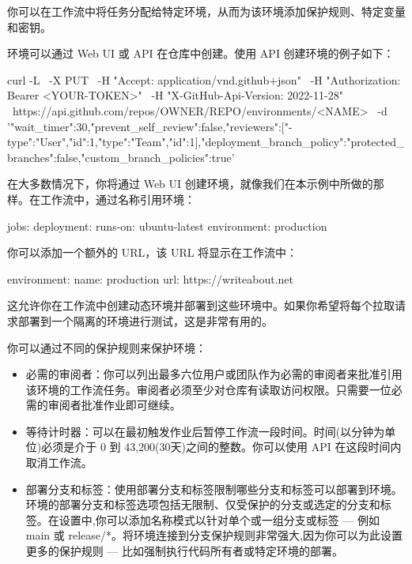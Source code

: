
你可以在工作流中将任务分配给特定环境，从而为该环境添加保护规则、特定变量和密钥。


环境可以通过 Web UI 或 API 在仓库中创建。使用 API 创建环境的例子如下：

\begin{shell}
curl -L \
  -X PUT \
  -H "Accept: application/vnd.github+json" \
  -H "Authorization: Bearer <YOUR-TOKEN>" \
  -H "X-GitHub-Api-Version: 2022-11-28" \
  https://api.github.com/repos/OWNER/REPO/environments/<NAME> \
  -d '{"wait_timer":30,"prevent_self_review":false,"reviewers":[{"-type":"User","id":1},{"type":"Team","id":1}],"deployment_branch_policy":{"protected_branches":false,"custom_branch_policies":true}}'
\end{shell}

在大多数情况下，你将通过 Web UI 创建环境，就像我们在本示例中所做的那样。在工作流中，通过名称引用环境：

\begin{shell}
jobs:
  deployment:
    runs-on: ubuntu-latest
    environment: production
\end{shell}

你可以添加一个额外的 URL，该 URL 将显示在工作流中：

\begin{shell}
environment:
  name: production
  url: https://writeabout.net
\end{shell}

这允许你在工作流中创建动态环境并部署到这些环境中。如果你希望将每个拉取请求部署到一个隔离的环境进行测试，这是非常有用的。

你可以通过不同的保护规则来保护环境：

\begin{itemize}
\item 
必需的审阅者：你可以列出最多六位用户或团队作为必需的审阅者来批准引用该环境的工作流任务。审阅者必须至少对仓库有读取访问权限。只需要一位必需的审阅者批准作业即可继续。

\item 
等待计时器：可以在最初触发作业后暂停工作流一段时间。时间(以分钟为单位)必须是介于 0 到 43,200(30天)之间的整数。你可以使用 API 在这段时间内取消工作流。

\item 
部署分支和标签：使用部署分支和标签限制哪些分支和标签可以部署到环境。环境的部署分支和标签选项包括无限制、仅受保护的分支或选定的分支和标签。在设置中,你可以添加名称模式以针对单个或一组分支或标签 --- 例如 main 或 release/*。将环境连接到分支保护规则非常强大,因为你可以为此设置更多的保护规则 --- 比如强制执行代码所有者或特定环境的部署。
\end{itemize}

